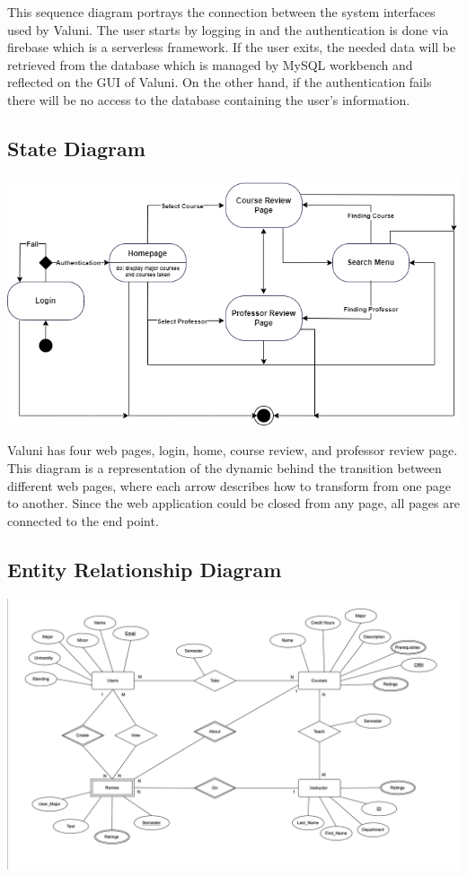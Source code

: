 \documentclass{article}
\begin{document}
\quad This sequence diagram portrays the connection between the system interfaces used by Valuni. The user starts by logging in and the authentication is done via firebase which is a serverless framework. If the user exits, the needed data will be retrieved from the database which is managed by MySQL workbench and reflected on the GUI of Valuni. On the other hand, if the authentication fails there will be no access to the database containing the user’s information.

\subsection{State Diagram} 
\begin{center}
    \includegraphics[scale=0.7]{../../Milestone_2/Diagrams/B&W_StateDiagram.png}    
\end{center} 

\quad Valuni has four web pages, login, home, course review, and professor review page. This diagram is a representation of the dynamic behind the transition between different web pages, where each arrow describes how to transform from one page to another. Since the web application could be closed from any page, all pages are connected to the end point. 

\subsection{Entity Relationship Diagram}  
\begin{center}
    \includegraphics[scale=0.55]{../../Milestone_2/Diagrams/VALUNI_ERD.png}    
\end{center} 
\end{document}
